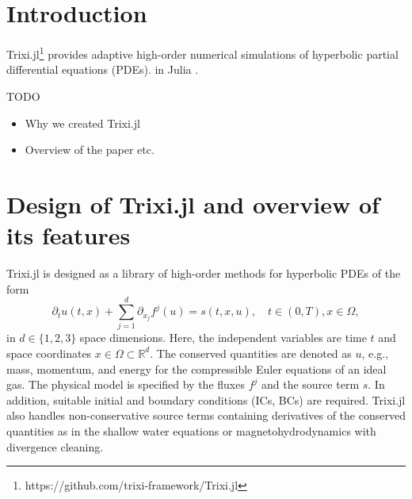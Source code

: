 \documentclass{juliacon}
\makeatletter
\newcommand{\eg}[0]{{e.g.\@}\xspace}
\newcommand{\etc}[0]{{etc.\@}\xspace}
\newcommand{\trixi}{Trixi.jl\xspace}
\newcommand{\todo}[1]{{\color{red}#1}}
\makeatother
\begin{document}


\maketitle

\begin{abstract}
We present Trixi.jl, a Julia library for adaptive high-order numerical simulations
of hyperbolic partial differential equations (PDEs). Utilizing Julia's strengths,
Trixi.jl is extendable, easy to use, and fast. We describe the main design choices
that allow satisfying these goals and compare Trixi.jl with an established open
source Fortran code for hyperbolic PDEs using the same numerical methods.
We conclude with an assessment of Julia for simulation-focused scientific
computing, an area that is still dominated by traditional high-performance
computing languages such as C, C++, and Fortran.
\end{abstract}


\section{Introduction}

\trixi\footnote{https://github.com/trixi-framework/Trixi.jl} provides adaptive
high-order numerical simulations of hyperbolic partial differential equations (PDEs).
in Julia \cite{bezanson2017julia}.

\todo{TODO %
\begin{itemize}
  \item Why we created \trixi
  \item Overview of the paper \etc
\end{itemize}}



\section{Design of \trixi and overview of its features}

\trixi is designed as a library of high-order methods for hyperbolic PDEs of
the form
\begin{equation}
\label{eq:hcl}
  \partial_t u(t, x) + \sum_{j=1}^d \partial_{x_j} f^j(u) = s(t, x, u),
  \quad t \in (0, T), x \in \Omega,
\end{equation}
in $d \in \{1, 2, 3\}$ space dimensions. Here, the independent variables are
time $t$ and space coordinates $x \in \Omega \subset \mathbb{R}^d$. The conserved
quantities are denoted as $u$, \eg, mass, momentum, and energy for the compressible
Euler equations of an ideal gas.
The physical model is specified by the fluxes $f^j$ and the source term $s$.
In addition, suitable initial and boundary conditions (ICs, BCs) are required.
\trixi also handles non-conservative source terms containing derivatives of the
conserved quantities as in the shallow water equations or magnetohydrodynamics
with divergence cleaning.
\end{document}
